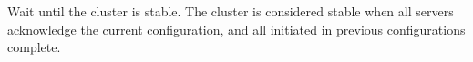 Wait until the cluster is stable.  The cluster is considered stable when all
servers acknowledge the current configuration, and all initiated in previous
configurations complete.
